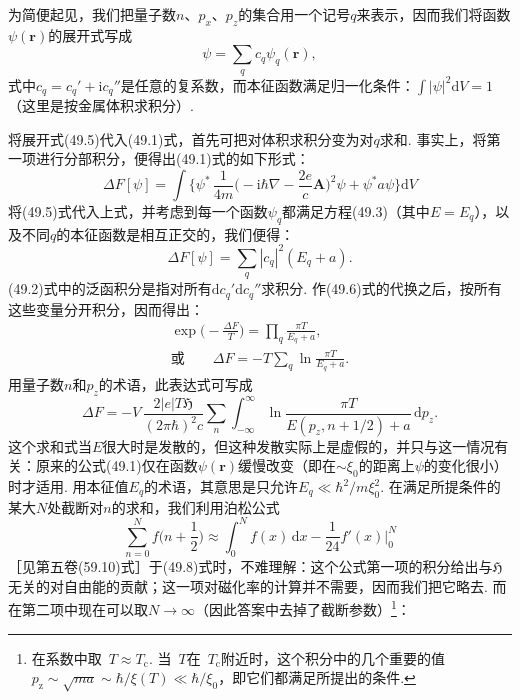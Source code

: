 为简便起见，我们把量子数$n$、$p_x$、$p_z$的集合用一个记号$q$来表示，因而我们将函数$\psi(\bm{r})$的展开式写成
\begin{equation}
\psi=\sum_q c_q\psi_q(\bm{r}),
\end{equation}
式中$c_q=c_q'+\mathrm{i}c_q''$是任意的复系数，而本征函数满足归一化条件：$\int|\psi|^2\mathrm{d}V=1$（这里是按金属体积求积分）.

将展开式(49.5)代入(49.1)式，首先可把对体积求积分变为对$q$求和. 事实上，将第一项进行分部积分，便得出(49.1)式的如下形式：
\begin{equation*}
\Delta F[\psi]=\int\biggl\{\psi^*\,\frac{1}{4m}
\biggl(-\mathrm{i}\hbar\nabla-\frac{2e}{c}\bm{A}\biggr)^{\!2}\psi+\psi^*a\psi\biggr\}\mathrm{d}V
\end{equation*}
将(49.5)式代入上式，并考虑到每一个函数$\psi_q$都满足方程(49.3)（其中$E=E_q$），以及不同$q$的本征函数是相互正交的，我们便得：
\begin{equation}
\Delta F[\psi]=\sum_q|c_q|^2(E_q+a).
\end{equation}
(49.2)式中的泛函积分是指对所有$\mathrm{d}c_q'\mathrm{d}c_q''$求积分. 作(49.6)式的代换之后，按所有这些变量分开积分，因而得出：
\begin{equation}
\begin{gathered}
\exp\biggl(-\frac{\Delta F}{T}\biggr)=\prod_q\frac{\pi T}{E_q+a},\\
\text{或}\qquad
\Delta F=-T\sum_q\ln\frac{\pi T}{E_q+a}.
\end{gathered}
\end{equation}
用量子数$n$和$p_z$的术语，此表达式可写成
\begin{equation}
\Delta F=-V\,\frac{2|e|T\mathfrak{H}}{(2\pi\hbar)^2c}\sum_n
\int_{-\infty}^{\infty}\ln\frac{\pi T}{E(p_z,n+1/2)+a}\,\mathrm{d}p_z.
\end{equation}
这个求和式当$E$很大时是发散的，但这种发散实际上是虚假的，并只与这一情况有关：原来的公式(49.1)仅在函数$\psi(\bm{r})$缓慢改变（即在$\sim\xi_0$的距离上$\psi$的变化很小）时才适用. 用本征值$E_q$的术语，其意思是只允许$E_q\ll\hbar^2/m\xi_0^2$. 在满足所提条件的某大$N$处截断对$n$的求和，我们利用泊松公式
\begin{equation*}
\sum_{n=0}^{N}f\biggl(n+\frac{1}{2}\biggr)\approx
\int_0^N f(x)\,\mathrm{d}x-\frac{1}{24}f'(x)\Big|_0^N
\end{equation*}
［见第五卷(59.10)式］于(49.8)式时，不难理解：这个公式第一项的积分给出与$\mathfrak{H}$无关的对自由能的贡献；这一项对磁化率的计算并不需要，因而我们把它略去. 而在第二项中现在可以取$N\to\infty$（因此答案中去掉了截断参数）\footnote{在系数中取~$T\approx T_{\mathrm{c}}$. 当~$T$在~$T_{\mathrm{c}}$附近时，这个积分中的几个重要的值~$p_{\mathrm z}\sim\sqrt{ma}\sim\hbar/\xi(T)\ll\hbar/\xi_0$，即它们都满足所提出的条件.}：
